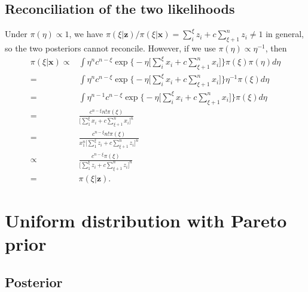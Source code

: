 \documentclass{article}
\begin{document}
\subsection{Reconciliation of the two likelihoods}
Under $\pi(\eta) \propto 1$,
we have
$\pi(\xi|\bm{z}) / \pi(\xi | \bm{x}) = \sum_i^\xi z_i + c \sum_{\xi+1}^n z_i \neq 1$
in general,
so the two posteriors cannot reconcile.
However, if we use $\pi(\eta) \propto \eta^{-1}$,
then
\begin{align*}
  \pi(\xi|\bm{x})
  \propto & \int \eta^n c^{n - \xi} \exp\Big\{ -\eta\Big[\sum_i^\xi x_i + c \sum_{\xi+1}^n x_i\Big]\Big\} \pi(\xi) \pi(\eta) d\eta \\
  = & \int \eta^n c^{n - \xi} \exp\Big\{ -\eta\Big[\sum_i^\xi x_i + c \sum_{\xi+1}^n x_i\Big]\Big\} \eta^{-1} \pi(\xi) d\eta \\
  = & \int \eta^{n-1} c^{n - \xi} \exp\Big\{ -\eta\Big[\sum_i^\xi x_i + c \sum_{\xi+1}^n x_i\Big]\Big\} \pi(\xi) d\eta \\
  = & \frac{c^{n-\xi} n! \pi(\xi)}{\Big[\sum_1^\xi x_i + c\sum_{\xi+1}^n x_i\Big]^{n}}  \\ 
  = & \frac{c^{n-\xi} n! \pi(\xi)}{x_1^n \Big[\sum_1^\xi z_i + c\sum_{\xi+1}^n z_i\Big]^{n}} \\
  \propto & \frac{c^{n-\xi} \pi(\xi)}{\Big[\sum_1^\xi z_i + c\sum_{\xi+1}^n z_i\Big]^{n}} \\
  = & \pi(\xi|\bm{z}).
\end{align*}

\section{Uniform distribution with Pareto prior}

\subsection{Posterior}
\end{document}
